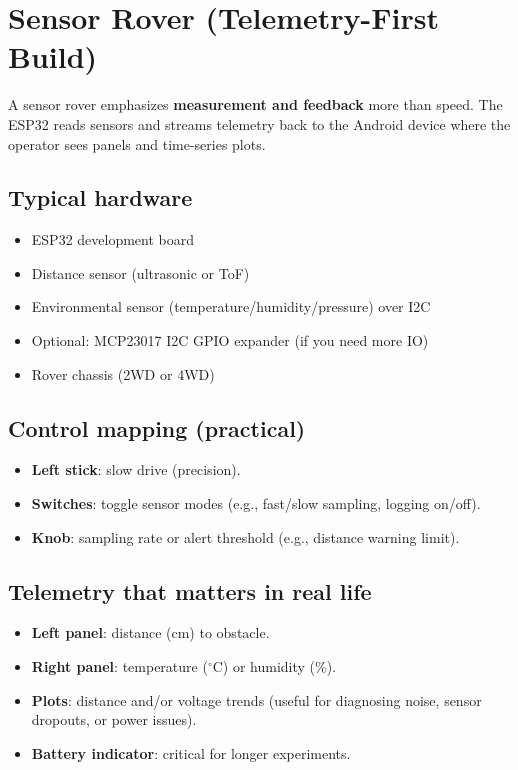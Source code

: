 \section{Sensor Rover (Telemetry-First Build)}
\label{sec:example-sensor-rover}

A sensor rover emphasizes \textbf{measurement and feedback} more than speed. The ESP32 reads sensors and streams telemetry back to the Android device where the operator sees panels and time-series plots.

\subsection*{Typical hardware}
\begin{itemize}
    \item ESP32 development board
    \item Distance sensor (ultrasonic or ToF)
    \item Environmental sensor (temperature/humidity/pressure) over I2C
    \item Optional: MCP23017 I2C GPIO expander (if you need more IO)
    \item Rover chassis (2WD or 4WD)
\end{itemize}

\subsection*{Control mapping (practical)}
\begin{itemize}
    \item \textbf{Left stick}: slow drive (precision).
    \item \textbf{Switches}: toggle sensor modes (e.g., fast/slow sampling, logging on/off).
    \item \textbf{Knob}: sampling rate or alert threshold (e.g., distance warning limit).
\end{itemize}

\subsection*{Telemetry that matters in real life}
\begin{itemize}
    \item \textbf{Left panel}: distance (cm) to obstacle.
    \item \textbf{Right panel}: temperature (\(^\circ\)C) or humidity (\%).
    \item \textbf{Plots}: distance and/or voltage trends (useful for diagnosing noise, sensor dropouts, or power issues).
    \item \textbf{Battery indicator}: critical for longer experiments.
\end{itemize}

